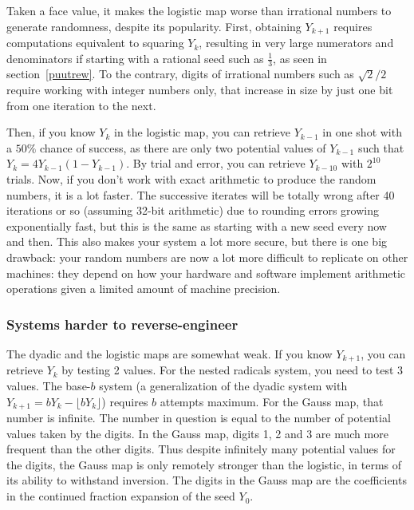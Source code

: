 \documentclass[oneside,10pt]{book}
\begin{document}
Taken a face value, it makes the logistic map worse than irrational numbers to generate randomness, despite its popularity.  
First, obtaining $Y_{k+1}$ requires computations equivalent to squaring $Y_k$, resulting in very large numerators and denominators if starting with a rational seed such as $\frac{1}{3}$, as seen in section~\ref{puutrew}. To the contrary, digits of irrational numbers such as
 $\sqrt{2}/2$ require working with integer numbers only, that increase in size by just one bit from one iteration to the next.

Then, if you know $Y_{k}$ in the logistic map, you can retrieve $Y_{k-1}$ in one shot with a $50\%$ chance of success, as there are only two potential values of $Y_{k-1}$ such that
 $Y_{k}=4Y_{k-1}(1-Y_{k-1})$. By trial and error, you can retrieve $Y_{k-10}$ with $2^{10}$ trials. Now, if you don't work with exact 
 arithmetic to produce the random numbers, it is a lot faster. The successive iterates will be totally wrong after 40 iterations or so (assuming 32-bit arithmetic) due
 to rounding errors growing exponentially fast, but this is the same as starting with a new seed every now and then. This also makes your system a lot more secure, but there is one big drawback: 
  your random numbers are now a lot more difficult to replicate on other machines: they depend on how your hardware and software implement arithmetic operations given a limited amount of machine precision.

\subsubsection{Systems harder to reverse-engineer}

The dyadic and the logistic maps are somewhat weak. If you know $Y_{k+1}$, you can retrieve $Y_k$ by testing 2 values. For the \textcolor{index}{nested radicals} system, you need to test 3 values.  The base-$b$ system (a generalization of the dyadic system with $Y_{k+1}=bY_k - \lfloor bY_k\rfloor$) requires $b$ attempts maximum.  For the 
 \textcolor{index}{Gauss map}, that number is infinite. The number in question is equal to the number of potential 
values taken by the digits. In the Gauss map, digits 1, 2 and 3 are much more frequent than the other digits. Thus despite
 infinitely many potential values for the digits, the Gauss map is only remotely stronger than the logistic, in terms of its ability to withstand inversion. The digits in the Gauss map are the coefficients in the continued fraction expansion of the seed $Y_0$. 
\end{document}

